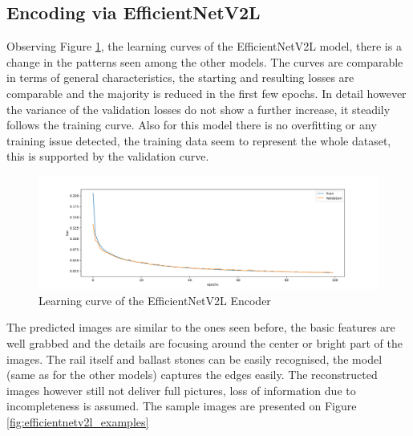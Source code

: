 \subsection{Encoding via EfficientNetV2L}
Observing Figure \ref{fig:efficientnetv2l_learning_curve}, the learning curves of the
EfficientNetV2L model, there is a change in the patterns seen among the other models.
The curves are comparable in terms of general characteristics, the starting and resulting losses are
comparable and the majority is reduced in the first few epochs.
In detail however the variance of the validation losses do not show a further increase,
it steadily follows the training curve.
Also for this model there is no overfitting or any training issue detected, the training data
seem to represent the whole dataset, this is supported by the validation curve.

\begin{figure}[!ht]
    \centering
    \includegraphics[width=\textwidth,trim={0 0 0 1cm},clip]{./results/efficientnetv2l_vgg19/20230525_194238_results.png}
    \caption{Learning curve of the EfficientNetV2L Encoder}
    \label{fig:efficientnetv2l_learning_curve}
\end{figure}

The predicted images are similar to the ones seen before, the basic features are well grabbed and
the details are focusing around the center or bright part of the images.
The rail itself and ballast stones can be easily recognised, the model (same as for the other models)
captures the edges easily.
The reconstructed images however still not deliver full pictures, loss of information due to
incompleteness is assumed.
The sample images are presented on Figure \ref{fig:efficientnetv2l_examples}

